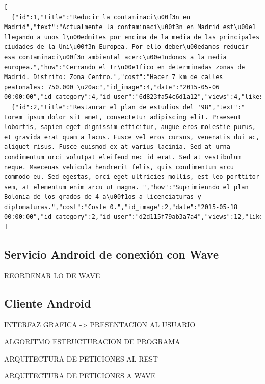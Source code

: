 \lstset{
  language        = c,    inputencoding=utf8}
\begin{lstlisting}[frame=single]
[
  {"id":1,"title":"Reducir la contaminaci\u00f3n en Madrid","text":"Actualmente la contaminaci\u00f3n en Madrid est\u00e1 llegando a unos l\u00edmites por encima de la media de las principales ciudades de la Uni\u00f3n Europea. Por ello deber\u00edamos reducir esa contaminaci\u00f3n ambiental acerc\u00e1ndonos a la media europea.","how":"Cerrando el tr\u00e1fico en determinadas zonas de Madrid. Distrito: Zona Centro.","cost":"Hacer 7 km de calles peatonales: 750.000 \u20ac","id_image":4,"date":"2015-05-06 00:00:00","id_category":4,"id_user":"6d823fa54c6d1a12","views":4,"likes":3,"not_understood":0,"dislikes":0},
  {"id":2,"title":"Restaurar el plan de estudios del '98","text":" Lorem ipsum dolor sit amet, consectetur adipiscing elit. Praesent lobortis, sapien eget dignissim efficitur, augue eros molestie purus, et gravida erat quam a lacus. Fusce vel eros cursus, venenatis dui ac, aliquet risus. Fusce euismod ex at varius lacinia. Sed at urna condimentum orci volutpat eleifend nec id erat. Sed at vestibulum neque. Maecenas vehicula hendrerit felis, quis condimentum arcu commodo eu. Sed egestas, orci eget ultricies mollis, est leo porttitor sem, at elementum enim arcu ut magna. ","how":"Suprimienndo el plan Bolonia de los grados de 4 a\u00f1os a licenciaturas y diplomaturas.","cost":"Coste 0.","id_image":2,"date":"2015-05-18 00:00:00","id_category":2,"id_user":"d2d115f79ab3a7a4","views":12,"likes":0,"not_understood":1,"dislikes":0}
]
\end{lstlisting}

\subsection{Servicio Android de conexión con Wave}

REORDENAR LO DE WAVE

\subsection{Cliente Android}

INTERFAZ GRAFICA -> PRESENTACION AL USUARIO

ALGORITMO ESTRUCTURACION DE PROGRAMA

ARQUITECTURA DE PETICIONES AL REST

ARQUITECTURA DE PETICIONES A WAVE

